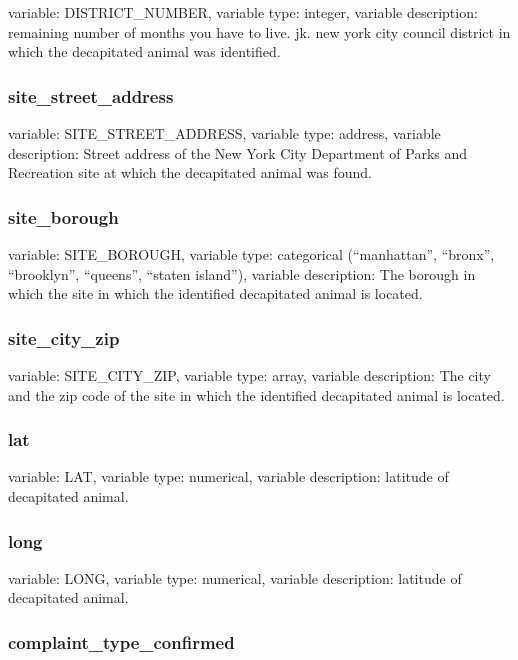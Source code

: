 \documentclass[]{article}
\begin{document}
variable: DISTRICT\_NUMBER, variable type: integer, variable
description: remaining number of months you have to live. jk. new york
city council district in which the decapitated animal was identified.

\subsubsection{site\_street\_address}\label{siteux5fstreetux5faddress}

variable: SITE\_STREET\_ADDRESS, variable type: address, variable
description: Street address of the New York City Department of Parks and
Recreation site at which the decapitated animal was found.

\subsubsection{site\_borough}\label{siteux5fborough}

variable: SITE\_BOROUGH, variable type: categorical (``manhattan'',
``bronx'', ``brooklyn'', ``queens'', ``staten island''), variable
description: The borough in which the site in which the identified
decapitated animal is located.

\subsubsection{site\_city\_zip}\label{siteux5fcityux5fzip}

variable: SITE\_CITY\_ZIP, variable type: array, variable description:
The city and the zip code of the site in which the identified
decapitated animal is located.

\subsubsection{lat}\label{lat}

variable: LAT, variable type: numerical, variable description: latitude
of decapitated animal.

\subsubsection{long}\label{long}

variable: LONG, variable type: numerical, variable description: latitude
of decapitated animal.

\subsubsection{complaint\_type\_confirmed}\label{complaintux5ftypeux5fconfirmed}
\end{document}
